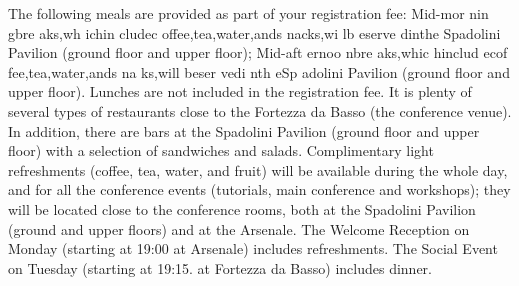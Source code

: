 The following meals are provided as part of your registration fee:
Mid-mor nin gbre aks,wh ichin cludec offee,tea,water,ands nacks,wi lb eserve dinthe Spadolini Pavilion (ground floor and upper floor);
Mid-aft ernoo nbre aks,whic hinclud ecof fee,tea,water,ands na ks,will beser vedi nth eSp adolini Pavilion (ground floor and upper floor).
Lunches are not included in the registration fee. It is plenty of several types of restaurants close to the Fortezza da Basso (the conference venue). In addition, there are bars at the Spadolini Pavilion (ground floor and upper floor) with a selection of sandwiches and salads.
Complimentary light refreshments (coffee, tea, water, and fruit) will be available during the whole day, and for all the conference events (tutorials, main conference and workshops); they will be located close to the conference rooms, both at the Spadolini Pavilion (ground and upper floors) and at the Arsenale.
The Welcome Reception on Monday (starting at 19:00 at Arsenale) includes refreshments. The Social Event on Tuesday (starting at 19:15. at Fortezza da Basso) includes dinner.